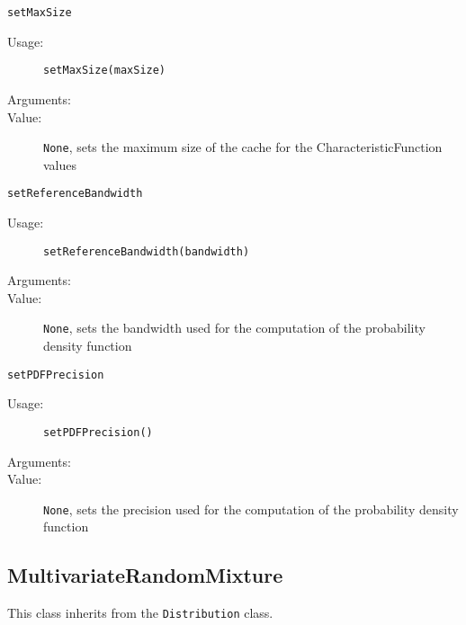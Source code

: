 \begin{description}
\begin{description}
  \item \texttt{setMaxSize}
    \begin{description}
    \item[Usage:]  \texttt{setMaxSize(maxSize)}
    \item[Arguments:]  \strut
    \item[Value:] \texttt{None}, sets the maximum size of the cache for the CharacteristicFunction values
    \end{description}

  \item \texttt{setReferenceBandwidth}
    \begin{description}
    \item[Usage:]  \texttt{setReferenceBandwidth(bandwidth)}
    \item[Arguments:] \strut
    \item[Value:] \texttt{None}, sets the bandwidth used for the computation of the probability density function
    \end{description}

  \item \texttt{setPDFPrecision}
    \begin{description}
    \item[Usage:]  \texttt{setPDFPrecision()}
    \item[Arguments:]  \strut
    \item[Value:] \texttt{None}, sets the precision used for the computation of the probability density function
    \end{description}

  \end{description}

\end{description}

\subsection{MultivariateRandomMixture}
This class inherits from the \texttt{Distribution} class.


